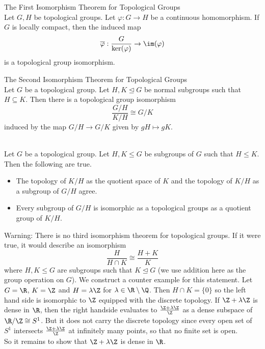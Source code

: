 \documentclass[a4paper]{article}
\begin{document}
\begin{thm}{The First Isomorphism Theorem for Topological Groups}{}\\
Let $G,H$ be topological groups. Let $\varphi:G\to H$ be a continuous homomorphism. If $G$ is locally compact, then the induced map $$\overline{\varphi}:\frac{G}{\ker(\varphi)}\to\im(\varphi)$$ is a topological group isomorphism. 
\end{thm}

\begin{thm}{The Second Isomorphism Theorem for Topological Groups}{}\\
Let $G$ be a topological group. Let $H,K\trianglelefteq G$ be normal subgroups such that $H\subseteq K$. Then there is a topological group isomorphism $$\frac{G/H}{K/H}\cong G/K$$ induced by the map $G/H\to G/K$ given by $gH\mapsto gK$. 
\end{thm}

\begin{prp}{}{}\\
Let $G$ be a topological group. Let $H,K\leq G$ be subgroups of $G$ such that $H\leq K$. Then the following are true. 
\begin{itemize}
\item The topology of $K/H$ as the quotient space of $K$ and the topology of $K/H$ as a subgroup of $G/H$ agree. 
\item Every subgroup of $G/H$ is isomorphic as a topological groups as a quotient group of $K/H$. 
\end{itemize}
\end{prp}

Warning: There is no third isomorphism theorem for topological groups. If it were true, it would describe an isomorphism $$\frac{H}{H\cap K}\cong\frac{H+K}{K}$$ where $H,K\leq G$ are subgroups such that $K\trianglelefteq G$ (we use addition here as the group operation on $G$). We construct a counter example for this statement. Let $G=\R$, $K=\Z$ and $H=\lambda\Z$ for $\lambda\in\R\setminus\Q$. Then $H\cap K=\{0\}$ so the left hand side is isomorphic to $\Z$ equipped with the discrete topology. If $\Z+\lambda\Z$ is dense in $\R$, then the right handside evaluates to $\frac{\Z+\lambda\Z}{\Z}$ as a dense subspace of $\R/\Z\cong S^1$. But it does not carry the discrete topology since every open set of $S^1$ intersects $\frac{\Z+\lambda\Z}{\Z}$ at infinitely many points, so that no finite set is open. \\

So it remains to show that $\Z+\lambda\Z$ is dense in $\R$. 
\end{document}
